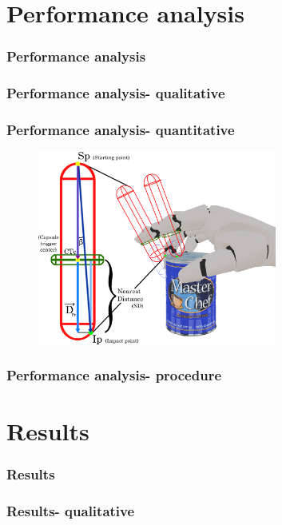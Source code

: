 \documentclass{beamer}
\theoremstyle{remark}
\theoremstyle{plain}
\begin{document}
\section{Performance analysis}

\begin{frame}
\frametitle{Performance analysis}

\end{frame}


\begin{frame}
\frametitle{Performance analysis- qualitative}

\end{frame}

\begin{frame}
\frametitle{Performance analysis- quantitative}

\begin{figure}
	\centering
	\includegraphics[width=0.7\textwidth]{images/distanceCalculusMod}
\end{figure}

\end{frame}


\begin{frame}
\frametitle{Performance analysis- procedure}

\end{frame}

\section{Results}

\begin{frame}
\frametitle{Results}

\end{frame}

\begin{frame}
\frametitle{Results- qualitative}

\end{frame}
\end{document}
